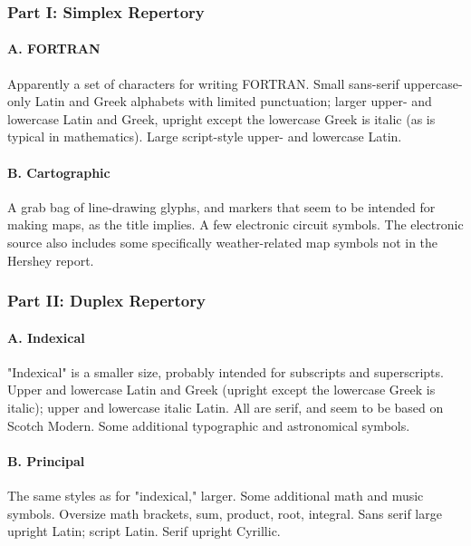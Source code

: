 \documentclass{article}
\begin{document}
\subsubsection*{Part I: Simplex Repertory}

\paragraph*{A. FORTRAN}

Apparently a set of characters for writing FORTRAN.  Small sans-serif
uppercase-only Latin and Greek alphabets with limited punctuation; larger
upper- and lowercase Latin and Greek, upright except the lowercase Greek is
italic (as is typical in mathematics).  Large script-style upper- and
lowercase Latin.

\paragraph*{B. Cartographic}

A grab bag of line-drawing glyphs, and markers that seem to be intended for
making maps, as the title implies.  A few electronic circuit symbols.  The
electronic source also includes some specifically weather-related map
symbols not in the Hershey report.

\subsubsection*{Part II: Duplex Repertory}

\paragraph*{A. Indexical}

"Indexical" is a smaller size, probably intended for subscripts and
superscripts.  Upper and lowercase Latin and Greek (upright except the
lowercase Greek is italic); upper and lowercase italic Latin.  All are
serif, and seem to be based on Scotch Modern.  Some additional typographic
and astronomical symbols.

\paragraph*{B. Principal}

The same styles as for "indexical," larger.  Some additional math and music
symbols.  Oversize math brackets, sum, product, root, integral.  Sans serif
large upright Latin; script Latin.  Serif upright Cyrillic.
\end{document}
